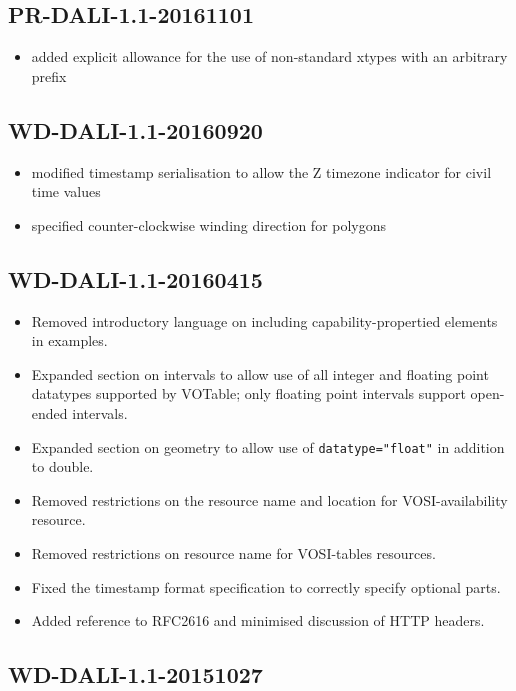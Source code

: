 \documentclass[11pt,letter]{ivoa}
\begin{document}
\subsection{PR-DALI-1.1-20161101}

\begin{itemize}
\item added explicit allowance for the use of non-standard xtypes with an 
arbitrary prefix
\end{itemize}

\subsection{WD-DALI-1.1-20160920}

\begin{itemize}
\item modified timestamp serialisation to allow the Z timezone indicator for 
civil time values
\item specified counter-clockwise winding direction for polygons
\end{itemize}

\subsection{WD-DALI-1.1-20160415}

\begin{itemize}
\item Removed introductory language on including capability-propertied elements in
examples.
\item Expanded section on intervals to allow use of all integer and floating point datatypes 
supported by VOTable; only floating point intervals support open-ended intervals.
\item Expanded section on geometry to allow use of \verb|datatype="float"| in addition to double.
\item Removed restrictions on the resource name and location for VOSI-availability resource.
\item Removed restrictions on resource name for VOSI-tables resources.
\item Fixed the timestamp format specification to correctly specify optional parts.
\item Added reference to RFC2616 and minimised discussion of HTTP headers.
\end{itemize}

\subsection{WD-DALI-1.1-20151027}
\end{document}
